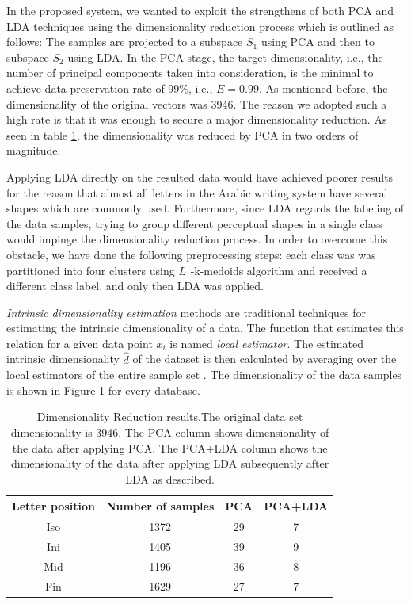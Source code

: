 \documentclass[10pt, conference, compsocconf]{IEEEtran}
\theoremstyle{definition}
\begin{document}
In the proposed system, we wanted to exploit the strengthens of both PCA and LDA techniques using the dimensionality reduction process which is outlined as follows: The samples are projected to a subspace $S_1$ using PCA and then to subspace $S_2$ using LDA. In the PCA stage, the target dimensionality, i.e., the number of principal components taken into consideration, is the minimal to achieve data preservation rate of 99\%, i.e., $E=0.99$. As mentioned before, the dimensionality of the original vectors was 3946. The reason we adopted such a high rate is that it was enough to secure a major dimensionality reduction. As seen in table \ref{table:dr_dimensions_results}, the dimensionality was reduced by PCA in two orders of magnitude.

Applying LDA directly on the resulted data would have achieved poorer results for the reason that almost all letters in the Arabic writing system have several shapes which are commonly used. 
Furthermore, since LDA regards the labeling of the data samples, trying to group different perceptual shapes in a single class would impinge the dimensionality reduction process. 
In order to overcome this obstacle, we have done the following preprocessing steps: each class was was partitioned into four clusters using $L_1$-k-medoids algorithm and received a different class label, and only then LDA was applied.

\emph{Intrinsic dimensionality estimation} methods are traditional techniques for estimating the intrinsic dimensionality of a data. 
The function that estimates this relation for a given data point $x_i$ is named \emph{local estimator}.
The estimated intrinsic dimensionality $\hat{d}$ of the dataset is then calculated by averaging over the local estimators of the entire sample set \cite{van2007introduction}.
The dimensionality of the data samples is shown in Figure \ref{table:dr_dimensions_results} for every database. 

\begin{table}
\centering
\begin{tabular}{ | c | c | c | c |}
\hline
Letter position & Number of samples & PCA & PCA+LDA\\
\hline                 
  Iso & 1372 & 29 & 7 \\ 
  \hline
  Ini & 1405 & 39 & 9 \\ 
  \hline
  Mid & 1196 & 36 & 8 \\ 
  \hline
  Fin & 1629 & 27 & 7 \\ 
  \hline
\end{tabular}
\caption{Dimensionality Reduction results.The original data set dimensionality is 3946. The PCA column shows dimensionality of the data after applying PCA. The PCA+LDA column shows the dimensionality of the data after applying LDA subsequently after LDA as described.}
\label{table:dr_dimensions_results} 
\end{table}
\end{document}
